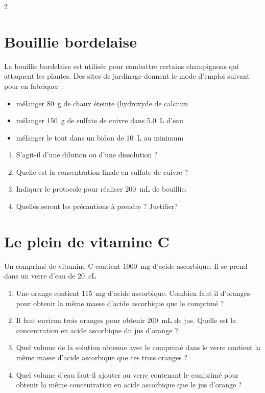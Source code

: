 \documentclass[a4paper,11pt,fleqn]{article}%
\begin{document}
\maketitle

\begin{multicols}{2}
\section{Bouillie bordelaise}
La bouillie bordelaise est utilisée pour combattre certains champignons qui attaquent les plantes. Des sites de jardinage donnent le mode d'emploi suivant pour en fabriquer :
\begin{itemize}
	\item mélanger \SI{80}{g} de chaux éteinte (hydroxyde de calcium 
	\item mélanger \SI{150}{g} de sulfate de cuivre  dans \SI{5,0}{L} d'eau
	\item mélanger le tout dans un bidon de \SI{10}{L} au minimum
\end{itemize}
\begin{enumerate}
	\item S'agit-il d'une dilution ou d'une dissolution ?
	\item Quelle est la concentration finale en sulfate de cuivre ?
	\item Indiquer le protocole pour réaliser \SI{200}{mL} de bouillie.
	\item Quelles seront les précautions à prendre ? Justifier?
\end{enumerate}

\section{Le plein de vitamine C}
Un comprimé de vitamine C contient \SI{1000}{mg} d'acide ascorbique. Il se prend dans un verre d'eau de \SI{20}{cL}
\begin{enumerate}
	\item Une orange contient \SI{115}{mg} d'acide ascorbique. Combien faut-il d'oranges pour obtenir la même masse d'acide ascorbique que le comprimé ?
	\item Il faut environ trois oranges pour obtenir \SI{200}{mL} de jus. Quelle est la concentration en acide ascorbique du jus d'orange ?
	\item Quel volume de la solution obtenue avec le comprimé dans le verre contient la même masse d'acide ascorbique que ces trois oranges ?
	\item Quel volume d'eau faut-il ajouter au verre contenant le comprimé pour obtenir la même concentration en acide ascorbique que le jus d'orange ?
\end{enumerate}


\end{multicols}
\end{document}
